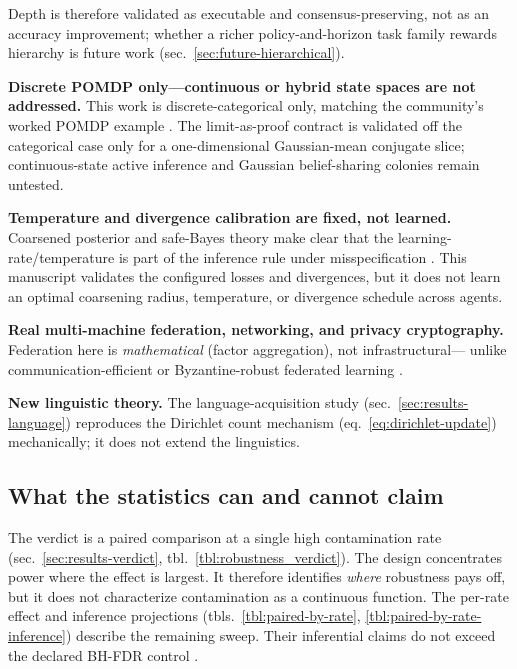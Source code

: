\documentclass[
  english,
]{article}
\theoremstyle{plain}
\theoremstyle{definition}
\theoremstyle{remark}
\theoremstyle{definition}
\begin{document}
Depth is therefore validated as executable and consensus-preserving, not
as an accuracy improvement; whether a richer policy-and-horizon task
family rewards hierarchy is future work
(sec.~\ref{sec:future-hierarchical}).

\textbf{Discrete POMDP only---continuous or hybrid state spaces are not
addressed.} This work is discrete-categorical only, matching the
community's worked POMDP example
\citep{dacosta2020active, friston2024federated}. The limit-as-proof
contract is validated off the categorical case only for a
one-dimensional Gaussian-mean conjugate slice; continuous-state active
inference and Gaussian belief-sharing colonies remain untested.

\textbf{Temperature and divergence calibration are fixed, not learned.}
Coarsened posterior and safe-Bayes theory make clear that the
learning-rate/temperature is part of the inference rule under
misspecification
\citep{miller2018coarsening, grunwald2012safe, kleijn2012misspecification}.
This manuscript validates the configured losses and divergences, but it
does not learn an optimal coarsening radius, temperature, or divergence
schedule across agents.

\textbf{Real multi-machine federation, networking, and privacy
cryptography.} Federation here is \emph{mathematical} (factor
aggregation), not infrastructural--- unlike communication-efficient or
Byzantine-robust federated learning
\citep{mcmahan2017communication, blanchard2017krum}.

\textbf{New linguistic theory.} The language-acquisition study
(sec.~\ref{sec:results-language}) reproduces the Dirichlet count
mechanism (eq.~\ref{eq:dirichlet-update}) mechanically; it does not
extend the linguistics.

\subsection{What the statistics can and cannot
claim}\label{sec:limitations-stats}

The verdict is a paired comparison at a single high contamination rate
(sec.~\ref{sec:results-verdict}, tbl.~\ref{tbl:robustness_verdict}). The
design concentrates power where the effect is largest. It therefore
identifies \emph{where} robustness pays off, but it does not
characterize contamination as a continuous function. The per-rate effect
and inference projections
(tbls.~\ref{tbl:paired-by-rate}, \ref{tbl:paired-by-rate-inference})
describe the remaining sweep. Their inferential claims do not exceed the
declared BH-FDR control \citep{benjamini1995controlling}.
\end{document}
